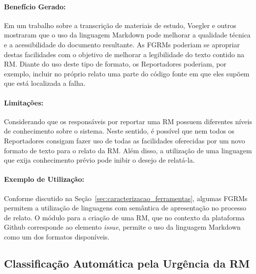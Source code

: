 \paragraph{Benefício Gerado:}
\label{par:papéis_afetados_s06}

Em um trabalho sobre a transcrição de materiais de estudo, Voegler e
outros~\cite{voegler2014markdown} mostraram que o uso da linguagem Markdown pode
melhorar a qualidade técnica e a acessibilidade do documento resultante. As
FGRMs poderiam se apropriar destas facilidades com o objetivo de melhorar a
legibilidade do texto contido na RM\@. Diante do uso deste tipo de formato, os
Reportadores poderiam, por exemplo, incluir no próprio relato uma parte do
código fonte em que eles supõem que está localizada a falha.

\paragraph{Limitações:}
\label{par:limitacoes_s06}

Considerando que os responsáveis por reportar uma RM possuem diferentes níveis
de conhecimento sobre o sistema. Neste sentido, é possível que nem todos os
Reportadores consigam fazer uso de todas as facilidades oferecidas por um novo
formato de texto para o relato da RM\@. Além disso, a utilização de uma
linguagem que exija conhecimento prévio pode inibir o desejo de relatá-la.

\paragraph{Exemplo de Utilização:}
\label{par:exemplo_de_utilização_s06}

Conforme discutido na Seção~\ref{sec:caracterizacao_ferramentas}, algumas FGRMs
permitem a utilização de linguagens com semântica de apresentação no processo de
relato. O módulo para a criação de uma RM, que no contexto da plataforma Github
corresponde ao elemento \textit{issue}, permite o uso da linguagem Markdown como
um dos formatos disponíveis.

\subsection{Classificação Automática pela Urgência da RM}
\label{sub:priorizacao_automatica_rms}


